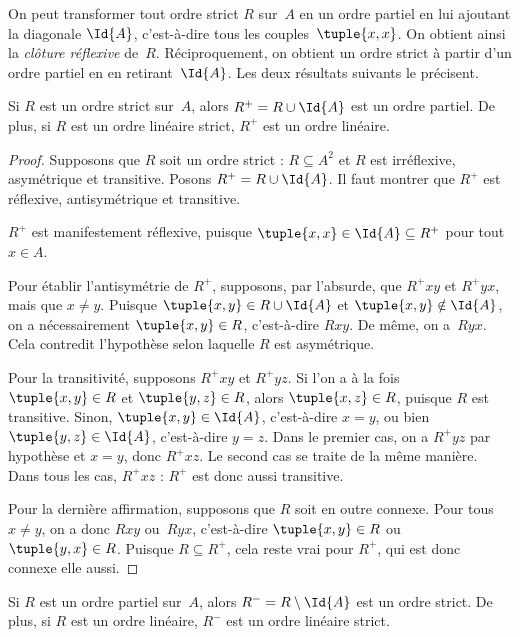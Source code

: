 \documentclass[11pt,a4paper,openany]{memoir}
\begin{document}
On peut transformer tout ordre strict $R$ sur~$A$ en un ordre partiel
en lui ajoutant la diagonale $\Id{A}$, c’est-à-dire tous les
couples~$\tuple{x, x}$. On obtient ainsi la \emph{clôture réflexive} de~$R$.
Réciproquement, on obtient un ordre strict à partir d’un ordre partiel
en en retirant~$\Id{A}$. Les deux résultats suivants le précisent.

\begin{prop}
Si $R$ est un ordre strict sur~$A$, alors $R^+ = R \cup \Id{A}$ est un
ordre partiel. De plus, si $R$ est un ordre linéaire strict, $R^+$ est
un ordre linéaire.
\end{prop}

\begin{proof}
Supposons que $R$ soit un ordre strict : $R \subseteq A^2$ et $R$ est
irréflexive, asymétrique et transitive. Posons $R^+ = R \cup \Id{A}$.
Il faut montrer que $R^+$ est réflexive, antisymétrique et transitive.

$R^+$ est manifestement réflexive, puisque
$\tuple{x, x} \in \Id{A} \subseteq R^+$ pour tout $x \in A$.

Pour établir l’antisymétrie de $R^+$, supposons, par l’absurde, que
$R^+xy$ et $R^+yx$, mais que $x \neq y$. Puisque
$\tuple{x,y} \in R \cup \Id{A}$ et $\tuple{x, y} \notin \Id{A}$,
on a nécessairement $\tuple{x, y} \in R$, c’est-à-dire $Rxy$.
De même, on a~$Ryx$. Cela contredit l’hypothèse selon laquelle $R$
est asymétrique.

Pour la transitivité, supposons $R^+xy$ et $R^+yz$. Si l’on a à la fois
$\tuple{x, y} \in R$ et $\tuple{y,z} \in R$, alors
$\tuple{x, z} \in R$, puisque $R$ est transitive. Sinon,
$\tuple{x, y} \in \Id{A}$, c’est-à-dire $x = y$, ou bien
$\tuple{y, z} \in \Id{A}$, c’est-à-dire $y = z$.
Dans le premier cas, on a $R^+yz$ par hypothèse et $x = y$, donc $R^+xz$.
Le second cas se traite de la même manière. Dans tous les cas, $R^+xz$ :
$R^+$ est donc aussi transitive.

Pour la dernière affirmation, supposons que $R$ soit en outre connexe.
Pour tous $x \neq y$, on a donc $Rxy$ ou~$Ryx$, c’est-à-dire
$\tuple{x, y} \in R$ ou $\tuple{y, x} \in R$.
Puisque $R \subseteq R^+$, cela reste vrai pour $R^+$, qui est donc
connexe elle aussi.
\end{proof}

\begin{prop}
Si $R$ est un ordre partiel sur~$A$, alors $R^- = R \setminus \Id{A}$
est un ordre strict. De plus, si $R$ est un ordre linéaire, $R^-$ est
un ordre linéaire strict.
\end{prop}
\end{document}
